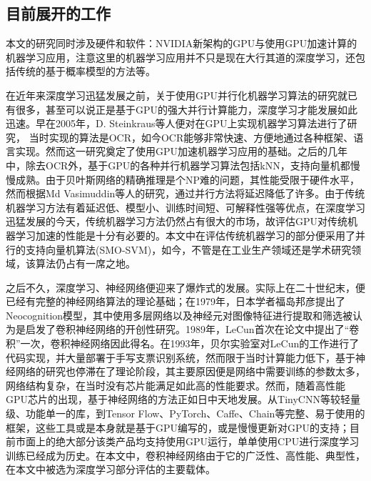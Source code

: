 \subsection{目前展开的工作}
\par 本文的研究同时涉及硬件和软件：NVIDIA新架构的GPU与使用GPU加速计算的机器学习应用，注意这里的机器学习应用并不只是现在大行其道的深度学习，还包括传统的基于概率模型的方法等。
\par 在近年来深度学习迅猛发展之前，关于使用GPU并行化机器学习算法的研究就已有很多，甚至可以说正是基于GPU的强大并行计算能力，深度学习才能发展如此迅速。早在2005年，D. Steinkraus等人便对在GPU上实现机器学习算法进行了研究， 当时实现的算法是OCR，如今OCR能够非常快速、方便地通过各种框架、语言实现。然而这一研究奠定了使用GPU加速机器学习应用的基础\cite{GPUFORML}。之后的几年中，除去OCR外，基于GPU的各种并行机器学习算法包括kNN\cite{KNNG}，支持向量机\cite{SMOSVM}都慢慢成熟。由于贝叶斯网络的精确推理是个NP难的问题，其性能受限于硬件水平，然而根据Md Vasimuddin等人的研究\cite{BAYESINF}，通过并行方法将延迟降低了许多。由于传统机器学习方法有着延迟低、模型小、训练时间短、可解释性强等优点，在深度学习迅猛发展的今天，传统机器学习方法仍然占有很大的市场，故评估GPU对传统机器学习加速的性能是十分有必要的。本文中在评估传统机器学习的部分便采用了并行的支持向量机算法(SMO-SVM)，如今，不管是在工业生产领域还是学术研究领域，该算法仍占有一席之地。
\par 之后不久，深度学习、神经网络便迎来了爆炸式的发展。实际上在二十世纪末，便已经有完整的神经网络算法的理论基础；在1979年，日本学者福岛邦彦提出了Neocognition模型，其中使用多层网络以及神经元对图像特征进行提取和筛选被认为是启发了卷积神经网络的开创性研究\cite{JAPANESSAY}。1989年，LeCun首次在论文中提出了“卷积”一次，卷积神经网络因此得名\cite{LENET}。在1993年，贝尔实验室对LeCun的工作进行了代码实现，并大量部署于手写支票识别系统，然而限于当时计算能力低下，基于神经网络的研究也停滞在了理论阶段，其主要原因便是网络中需要训练的参数太多，网络结构复杂，在当时没有芯片能满足如此高的性能要求\cite{NNML}。然而，随着高性能GPU芯片的出现，基于神经网络的方法正如日中天地发展。从TinyCNN等较轻量级、功能单一的库，到Tensor Flow、PyTorch、Caffe、Chain等完整、易于使用的框架，这些工具或是本身就是基于GPU编写的，或是慢慢更新对GPU的支持；目前市面上的绝大部分该类产品均支持使用GPU运行，单单使用CPU进行深度学习训练已经成为历史。在本文中，卷积神经网络由于它的广泛性、高性能、典型性，在本文中被选为深度学习部分评估的主要载体。
